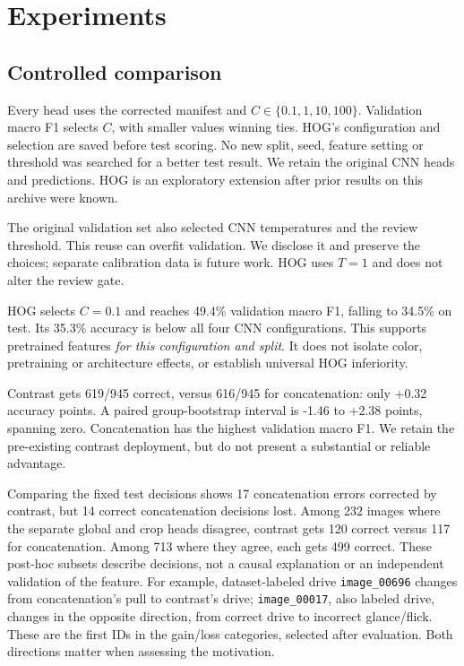 \section{Experiments}
\subsection{Controlled comparison}
Every head uses the corrected manifest and $C\in\{0.1,1,10,100\}$. Validation macro F1 selects $C$, with smaller values winning ties. HOG's configuration and selection are saved before test scoring. No new split, seed, feature setting or threshold was searched for a better test result. We retain the original CNN heads and predictions. HOG is an exploratory extension after prior results on this archive were known.

The original validation set also selected CNN temperatures and the review threshold. This reuse can overfit validation. We disclose it and preserve the choices; separate calibration data is future work. HOG uses $T=1$ and does not alter the review gate.


HOG selects $C=0.1$ and reaches 49.4\% validation macro F1, falling to 34.5\% on test. Its 35.3\% accuracy is below all four CNN configurations. This supports pretrained features \emph{for this configuration and split}. It does not isolate color, pretraining or architecture effects, or establish universal HOG inferiority.

Contrast gets 619/945 correct, versus 616/945 for concatenation: only +0.32 accuracy points. A paired group-bootstrap interval is -1.46 to +2.38 points, spanning zero. Concatenation has the highest validation macro F1. We retain the pre-existing contrast deployment, but do not present a substantial or reliable advantage.


Comparing the fixed test decisions shows 17 concatenation errors corrected by contrast, but 14 correct concatenation decisions lost. Among 232 images where the separate global and crop heads disagree, contrast gets 120 correct versus 117 for concatenation. Among 713 where they agree, each gets 499 correct. These post-hoc subsets describe decisions, not a causal explanation or an independent validation of the feature. For example, dataset-labeled drive \texttt{image\_00696} changes from concatenation's pull to contrast's drive; \texttt{image\_00017}, also labeled drive, changes in the opposite direction, from correct drive to incorrect glance/flick. These are the first IDs in the gain/loss categories, selected after evaluation. Both directions matter when assessing the motivation.

